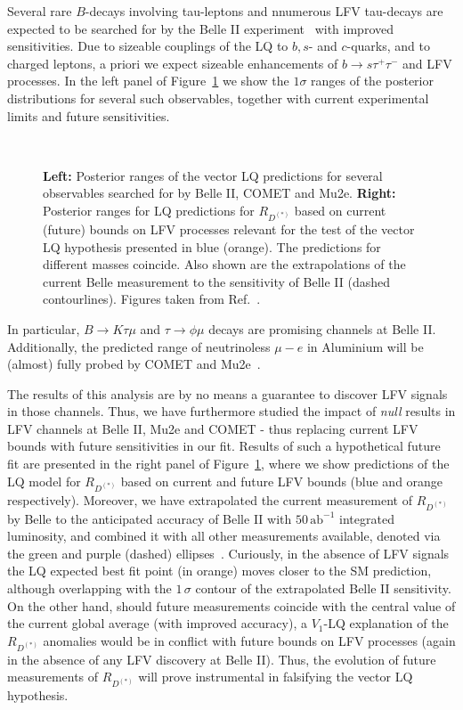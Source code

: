 \documentclass[a4paper,11pt]{article}
\def\rdrds{R_{D^{(\ast)}}}
\begin{document}
Several rare $B$-decays involving tau-leptons and nnumerous LFV tau-decays are expected to be searched for by the Belle II experiment~\cite{Kou:2018nap} with improved sensitivities.
Due to sizeable couplings of the LQ to $b, s$- and $c$-quarks, and to charged leptons, a priori we expect sizeable enhancements of $b\to s \tau^+\tau^-$ and LFV processes.
In the left panel of Figure~\ref{fig:predictions} we show the $1\sigma$ ranges of the posterior distributions for several such observables, together with current experimental limits and future sensitivities.
\begin{figure}
    \centering
    \mbox{\hspace{-10mm}
    {\hspace{-4mm}}}
    \caption{{\bf Left:} Posterior ranges of the vector LQ predictions for several observables searched for by Belle II, COMET and Mu2e. {\bf Right:} Posterior ranges for LQ predictions for $\rdrds$ based on current (future) bounds on LFV processes relevant for the test of the vector LQ hypothesis presented in blue (orange). The predictions for different masses coincide. Also shown are the extrapolations of the current Belle measurement to the sensitivity of Belle II (dashed contourlines). Figures taken from Ref.~\cite{LQ2020}.}
    \label{fig:predictions}
\end{figure}
In particular, $B\to K\tau\mu$ and $\tau\to\phi\mu$ decays are promising channels at Belle II. Additionally, the predicted range of neutrinoless $\mu-e$ in Aluminium will be (almost) fully probed by COMET and Mu2e~\cite{mutoe}.

The results of this analysis are by no means a guarantee to discover LFV signals in those channels. 
Thus, we have furthermore studied the impact of {\it null} results in LFV channels at Belle II, Mu2e and COMET - thus replacing current LFV bounds with future sensitivities in our fit.
Results of such a hypothetical future fit are presented in the right panel of Figure~\ref{fig:predictions}, where we show predictions of the LQ model for $\rdrds$ based on current and future LFV bounds (blue and orange respectively).
Moreover, we have extrapolated the current measurement of $\rdrds$ by Belle to the anticipated accuracy of Belle II with $50\,\mathrm{ab}^{-1}$ integrated luminosity, and combined it with all other measurements available, denoted via the green and purple (dashed) ellipses~\cite{LQ2020}.
Curiously, in the absence of LFV signals the LQ expected best fit point (in orange) moves closer to the SM prediction, although overlapping with the $1\,\sigma$ contour of the extrapolated Belle II sensitivity.
On the other hand, should future measurements coincide with the central value of the current global average (with improved accuracy), a $V_1$-LQ explanation of the $\rdrds$ anomalies would be in conflict with future bounds on LFV processes (again in the absence of any LFV discovery at Belle II).
Thus, the evolution of future measurements of $\rdrds$ will prove instrumental in falsifying the vector LQ hypothesis. 
\end{document}
